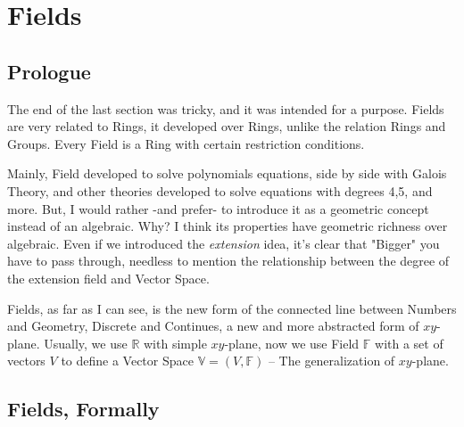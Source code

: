 \section{Fields \label{fields}}

\subsection{Prologue}
The end of the last section was tricky, and it was intended for a purpose. Fields are very related to Rings, it developed over Rings, unlike the relation Rings and Groups. Every Field is a Ring with certain restriction conditions.

Mainly, Field developed to solve polynomials equations, side by side with Galois Theory, and other theories developed to solve equations with degrees 4,5, and more. But, I would rather -and prefer- to introduce it as a geometric concept instead of an algebraic. Why? I think its properties have geometric richness over algebraic. Even if we introduced the {\it extension} idea, it's clear that "Bigger" you have to pass through, needless to mention the relationship between the degree of the extension field and Vector Space.

Fields, as far as I can see, is the new form of the connected line between Numbers and Geometry, Discrete and Continues, a new and more abstracted form of $xy$-plane. Usually, we use $\mathbb{R}$ with simple $xy$-plane, now we use Field $\mathbb{F}$ with a set of vectors $V$ to define a Vector Space $\mathbb{V}= (V, \mathbb{F})$ -- The generalization of $xy$-plane.

\subsection{Fields, Formally}
